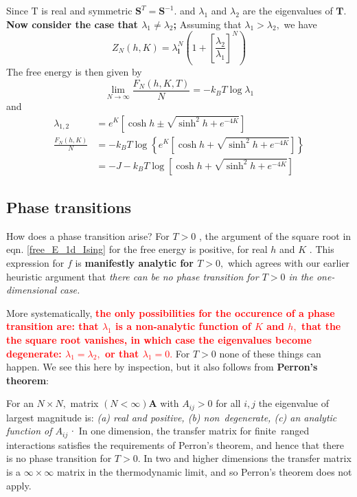 \documentclass[12pt,titlepage]{article}
\numberwithin{equation}{section}
\begin{document}
Since $\mathrm{T}$ is real and symmetric $\mathbf{S}^{T}=\mathbf{S}^{-1}$. and $\lambda_{1}$ and $\lambda_{2}$ are the eigenvalues of $\mathbf{T}$. \textbf{Now consider the case that $\lambda_{1} \neq \lambda_{2}$;} Assuming that $\lambda_{1}>\lambda_{2},$ we have
\begin{equation}
Z_{N}(h, K)=\lambda_{\mathbf{l}}^{N}\left(1+\left[\frac{\lambda_{2}}{\lambda_{1}}\right]^{N}\right)
\end{equation}
The free energy is then given by
\begin{equation}
\lim _{N \rightarrow \infty} \frac{F_{N}(h, K, T)}{N}=-k_{B} T \log \lambda_{1}
\end{equation}
and 
\begin{equation}
\label{free_E_1d_Ising}
\begin{aligned} \lambda_{1,2} &=e^{K}\left[\cosh h \pm \sqrt{\sinh ^{2} h+e^{-4 K}}\right] \\ \frac{F_{N}(h, K)}{N} &=-k_{B} T \log \left\{e^{K}\left[\cosh h+\sqrt{\sinh ^{2} h+e^{-4 K}}\right]\right\} \\ &=-J-k_{B} T \log \left[\cosh h+\sqrt{\sinh ^{2} h+e^{-4 K}}\right] \end{aligned}
\end{equation}
\subsection{Phase transitions}
How does a phase transition arise? For $T>0$ , the argument of the square root in eqn. \ref{free_E_1d_Ising} for the free energy is positive, for real $h$ and $K$ . This expression for $f$ is \textbf{manifestly analytic for $T>0,$} which agrees with our earlier heuristic argument that \emph{there can be no phase transition for $T>0$ in the one-dimensional case.}

More systematically, \textcolor{red}{\textbf{the only possibilities for the occurence of a phase transition are: that $\lambda_{1}$ is a non-analytic function of $K$ and $h,$ that the the square root vanishes, in which case the eigenvalues become degenerate: $\lambda_{1}=\lambda_{2},$ or that $\lambda_{1}=0 .$}} For $T>0$ none of these things can happen. We see this here by inspection, but it also follows from \textbf{Perron's theorem}:

For an $N \times N,$ matrix $(N<\infty) \mathbf{A}$ with $A_{i j}>0$ for all $i, j$ the eigenvalue of largest magnitude is: \textit{(a) real and positive, (b) non~degenerate, (c) an analytic function of $A_{ij}$·}
In one dimension, the transfer matrix for finite~ranged interactions satisfies the requirements of Perron's theorem, and hence that there is no phase transition for $T > 0$. In two and higher dimensions the transfer matrix is a $\infty \times \infty$ matrix in the thermodynamic limit, and so Perron's theorem does not apply.
\end{document}
